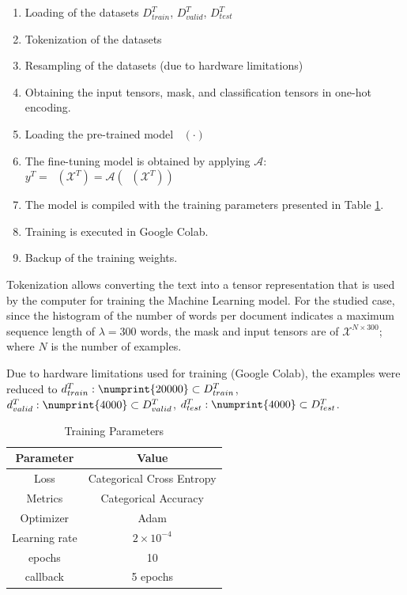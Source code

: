 \documentclass[onecolumn, journal, english, 12pt, a4paper]{IEEEtran} %
\DeclareMathOperator{\ypredtarget}{\phi^{T}}
\DeclareMathOperator{\ypredsource}{\phi^{S}}
\theoremstyle{definition}
\begin{document}
\begin{enumerate}
    \item Loading of the datasets $D^T_{train}$, $D^T_{valid}$, $D^T_{test}$
    \item Tokenization of the datasets
    \item Resampling of the datasets (due to hardware limitations)
    \item Obtaining the input tensors, mask, and classification
      tensors in one-hot encoding.
    \item Loading the pre-trained model $\ypredsource(\cdot)$
    \item The fine-tuning model is obtained by applying $\mathcal{A}$: $y^T = \ypredtarget(\mathbf{\mathcal{X}}^T) =  \mathcal{A}(\ypredsource(\mathbf{\mathcal{X}}^T))$
    \item The model is compiled with the training parameters presented
      in Table \ref{tab:trainingParam}.
    \item Training is executed in Google Colab.
    \item Backup of the training weights.
\end{enumerate}

Tokenization allows converting the text into a tensor representation
that is used by the computer for training the Machine Learning
model. For the studied case, since the histogram of the number of
words per document indicates a maximum sequence length of
$\lambda = 300$ words, the mask and input tensors are of
$\mathbf{\mathcal{X}}^{N\times300}$; where $N$ is the number of
examples.

Due to hardware limitations used for training (Google Colab), the
examples were reduced to
$d^T_{train}:\numprint{20000} \subset D^T_{train}$,
$d^T_{valid}:\numprint{4000} \subset D^T_{valid}$,
$d^T_{test}:\numprint{4000} \subset D^T_{test}$.

\begin{table}[!t]
\renewcommand{\arraystretch}{1.3}
\caption{Training Parameters}
\label{tab:trainingParam}
\centering
\begin{tabular}{cc}
\hline
Parameter & Value\\
\hline
 Loss & Categorical Cross Entropy\\
Metrics & Categorical Accuracy \\
Optimizer & Adam \\
Learning rate & $2 \times 10^{-4}$ \\
epochs & 10 \\
callback & 5 epochs \\
\hline
\end{tabular}
\end{table}
\end{document}
